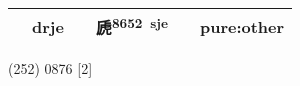 \documentclass[14pt,a4paper]{scrartcl}
\begin{document}
\begin{longtable}[c]{@{}llllll@{}}
\begin{minipage}[t]{0.14\columnwidth}
\strut\end{minipage} &
\begin{minipage}[t]{0.14\columnwidth}\raggedright\strut
drje
\strut\end{minipage} &
\begin{minipage}[t]{0.14\columnwidth}\raggedright\strut
\strut\end{minipage} &
\begin{minipage}[t]{0.14\columnwidth}\raggedright\strut
虒\textsuperscript{8652~sje}
\strut\end{minipage} &
\begin{minipage}[t]{0.14\columnwidth}\raggedright\strut
\strut\end{minipage} &
\begin{minipage}[t]{0.14\columnwidth}\raggedright\strut
pure:other
\strut\end{minipage}\tabularnewline
\bottomrule
\end{longtable}

(252) 0876 {[}2{]}
\end{document}
